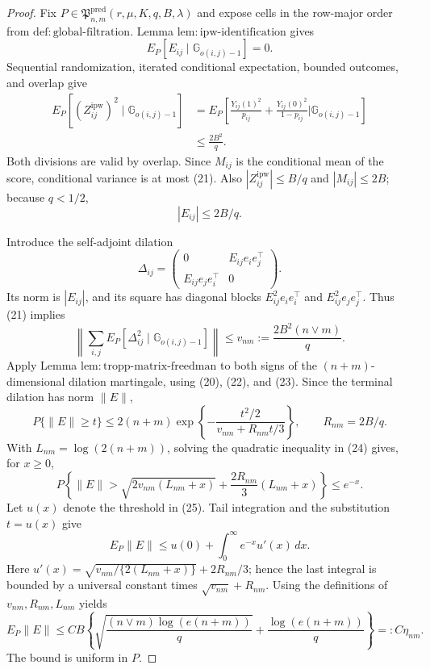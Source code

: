 \documentclass{article}
\begin{document}
\begin{proof}
Fix \(P\in\mathfrak P^{\mathrm{pred}}_{n,m}(r,\mu,K,q,B,\lambda)\) and expose cells in the row-major order from \(\mathrm{def:global\mbox{-}filtration}\).  Lemma \(\mathrm{lem:ipw\mbox{-}identification}\) gives
\[
 E_P[E_{ij}\mid\mathbb G_{o(i,j)-1}]=0.
 \tag{20}
\]
Sequential randomization, iterated conditional expectation, bounded outcomes, and overlap give
\[
 \begin{aligned}
 E_P[(Z^{\mathrm{ipw}}_{ij})^2\mid\mathbb G_{o(i,j)-1}]
 &=E_P\!\left[
 \frac{Y_{ij}(1)^2}{p_{ij}}+
 \frac{Y_{ij}(0)^2}{1-p_{ij}}
 \mathrel{\Big|}\mathbb G_{o(i,j)-1}\right]\\
 &\le\frac{2B^2}{q}.
 \end{aligned}
 \tag{21}
\]
Both divisions are valid by overlap.  Since \(M_{ij}\) is the conditional mean of the score, conditional variance is at most (21).  Also \(|Z^{\mathrm{ipw}}_{ij}|\le B/q\) and \(|M_{ij}|\le2B\); because \(q<1/2\),
\[
 |E_{ij}|\le2B/q.
 \tag{22}
\]

Introduce the self-adjoint dilation
\[
 \Delta_{ij}=\begin{pmatrix}
 0&E_{ij}e_ie_j^\top\\ E_{ij}e_je_i^\top&0
 \end{pmatrix}.
\]
Its norm is \(|E_{ij}|\), and its square has diagonal blocks \(E_{ij}^2e_ie_i^\top\) and \(E_{ij}^2e_je_j^\top\).  Thus (21) implies
\[
 \left\|\sum_{i,j}E_P[\Delta_{ij}^2\mid\mathbb G_{o(i,j)-1}]\right\|
 \le v_{nm}:=\frac{2B^2(n\vee m)}q.
 \tag{23}
\]
Apply Lemma \(\mathrm{lem:tropp\mbox{-}matrix\mbox{-}freedman}\) to both signs of the \((n+m)\)-dimensional dilation martingale, using (20), (22), and (23).  Since the terminal dilation has norm \(\|E\|\),
\[
 P\{\|E\|\ge t\}
 \le2(n+m)\exp\!\left\{-\frac{t^2/2}{v_{nm}+R_{nm}t/3}\right\},
 \qquad R_{nm}=2B/q.
 \tag{24}
\]
With \(L_{nm}=\log(2(n+m))\), solving the quadratic inequality in (24) gives, for \(x\ge0\),
\[
 P\!\left\{\|E\|>
 \sqrt{2v_{nm}(L_{nm}+x)}+\frac{2R_{nm}}3(L_{nm}+x)\right\}\le e^{-x}.
 \tag{25}
\]
Let \(u(x)\) denote the threshold in (25).  Tail integration and the substitution \(t=u(x)\) give
\[
 E_P\|E\|\le u(0)+\int_0^\infty e^{-x}u'(x)\,dx.
\]
Here \(u'(x)=\sqrt{v_{nm}/\{2(L_{nm}+x)\}}+2R_{nm}/3\); hence the last integral is bounded by a universal constant times \(\sqrt{v_{nm}}+R_{nm}\).  Using the definitions of \(v_{nm},R_{nm},L_{nm}\) yields
\[
 E_P\|E\|
 \le CB\left\{
 \sqrt{\frac{(n\vee m)\log(e(n+m))}{q}}+
 \frac{\log(e(n+m))}{q}\right\}
 =:C\eta_{nm}.
 \tag{26}
\]
The bound is uniform in \(P\).


\end{proof}
\end{document}
